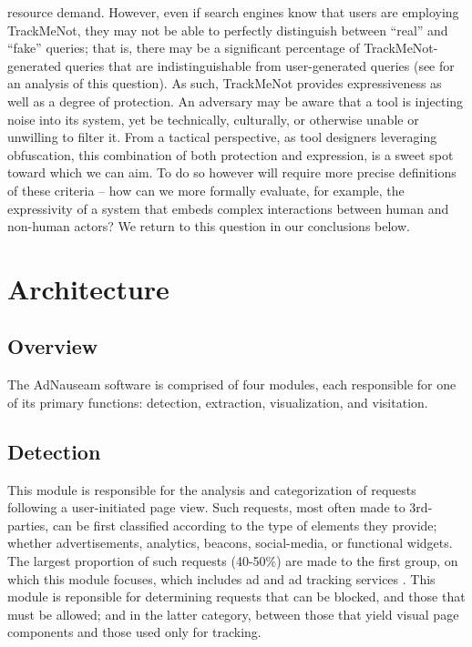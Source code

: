 \documentclass[conference]{IEEEtran}
\begin{document}
resource demand. However, even if search engines know that users are employing TrackMeNot, they may not be able to perfectly distinguish between “real” and “fake” queries; that is, there may be a significant percentage of TrackMeNot-generated queries that are indistinguishable from user-generated queries (see \cite{Gervais} for an analysis of this question). As such, TrackMeNot provides expressiveness as well as a degree of protection. An adversary may be aware that a tool is injecting noise into its system, yet be technically, culturally, or otherwise unable or unwilling to filter it. From a tactical perspective, as tool designers leveraging obfuscation, this combination of both protection and expression, is a sweet spot toward which we can aim. To do so however will require more precise definitions of these criteria -- how can we more formally evaluate, for example, the expressivity of a system that embeds complex interactions between human and non-human actors? We return to this question in our conclusions below.


\section{Architecture}

\subsection{Overview}

The AdNauseam software is comprised of four modules, each responsible for one of its primary functions: detection, extraction, visualization, and visitation.

\subsection{Detection}

This module is responsible for the analysis and categorization of requests following a user-initiated page view. Such requests, most often made to 3rd-parties, can be first classified according to the type of elements they provide; whether advertisements, analytics, beacons, social-media, or functional widgets. The largest proportion of such requests (40-50\%) are made to the first group, on which this module focuses, which includes ad and ad tracking services \cite{Wills}. This module is reponsible for determining requests that can be blocked, and those that must be allowed; and in the latter category, between those that yield visual page components and those used only for tracking.
\end{document}
